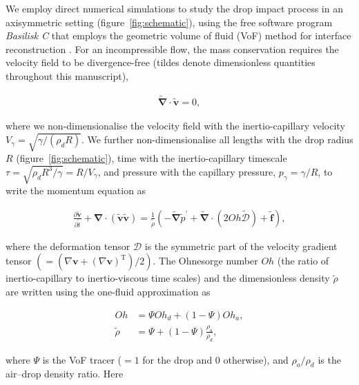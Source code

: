 \documentclass{jfm}
\newcommand{\Ohn}{\mathit{Oh}}
\newcommand{\Oha}{\mathit{Oh}_\mathit{a}}
\begin{document}
We employ direct numerical simulations to study the drop impact process in an axisymmetric setting (figure~\ref{fig:schematic}), using the free software program \emph{Basilisk C} \citep{popinet-basilisk} that employs the geometric volume of fluid (VoF) method for interface reconstruction \citep{popinet2009accurate}. For an incompressible flow, the mass conservation requires the velocity field to be divergence-free (tildes denote dimensionless quantities throughout this manuscript),

\begin{align}
	\boldsymbol{\tilde{\nabla}\cdot \tilde{v}} = 0,
\end{align}

\noindent where we non-dimensionalise the velocity field with the inertio-capillary velocity $V_\gamma = \sqrt{\gamma/(\rho_d R)}$.
We further non-dimensionalise all lengths with the drop radius $R$ (figure~\ref{fig:schematic}), time with the inertio-capillary timescale $\tau = \sqrt{\rho_dR^3/\gamma} = R/V_\gamma$, and pressure with the capillary pressure, $p_\gamma = \gamma/R$, to write the momentum equation as

\begin{align}
	\label{eq::NS}
	\frac{\partial \boldsymbol{\tilde{v}}}{\partial \tilde{t}} + \boldsymbol{\nabla \cdot}\left(\boldsymbol{\tilde{v}}\boldsymbol{\tilde{v}}\right) = \frac{1}{\tilde{\rho}}\left(-\boldsymbol{\tilde{\nabla}} \tilde{p}^{\prime} + \boldsymbol{\tilde{\nabla}\cdot}\left(2\Ohn\boldsymbol{\tilde{\mathcal{D}}}\right)  + \boldsymbol{\tilde{f}}\right),
\end{align}

\noindent where the deformation tensor $\boldsymbol{\mathcal{D}}$ is the symmetric part of the velocity gradient tensor $\left(= \left(\nabla\boldsymbol{v} + \left(\nabla\boldsymbol{v}\right)^{\text{T}}\right)/2\right)$.
The Ohnesorge number $\Ohn$ (the ratio of inertio-capillary to inertio-viscous time scales) and the dimensionless density $\tilde{\rho}$ are written using the one-fluid approximation \citep{prosperetti2009computational, tryggvason2011direct} as 

\begin{align}
	\label{eq::Oh}
	\Ohn &= \Psi\Ohn_d + \left(1-\Psi\right)\Oha,\\
	\label{eq::density}
	\tilde{\rho} &= \Psi + \left(1-\Psi\right)\frac{\rho_a}{\rho_d},
\end{align}

\noindent where $\Psi$ is the VoF tracer ($= 1$ for the drop and $0$ otherwise), and $\rho_a/\rho_d$ is the air--drop density ratio. Here
\end{document}
